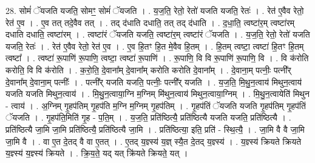 \documentclass[17pt]{extarticle}
\begin{document}
28. सोमं॑ ॅयजति यजति॒ सोमꣳ॒॒ सोमं॑ ॅयजति । . य॒ज॒ति॒ रेतो॒ रेतो॑ यजति यजति॒ रेतः॑ । . रेत॑ ए॒वैव रेतो॒ रेत॑ ए॒व । . ए॒व तत् तदे॒वैव तत् । . तद् द॑धाति दधाति॒ तत् तद् द॑धाति । . द॒धा॒ति॒ त्वष्टा॑र॒म् त्वष्टा॑रम् दधाति दधाति॒ त्वष्टा॑रम् । . त्वष्टा॑रं ॅयजति यजति॒ त्वष्टा॑र॒म् त्वष्टा॑रं ॅयजति । . य॒ज॒ति॒ रेतो॒ रेतो॑ यजति यजति॒ रेतः॑ । . रेत॑ ए॒वैव रेतो॒ रेत॑ ए॒व । . ए॒व हि॒तꣳ हि॒त मे॒वैव हि॒तम् । . हि॒तम् त्वष्टा॒ त्वष्टा॑ हि॒तꣳ हि॒तम् त्वष्टा᳚ । . त्वष्टा॑ रू॒पाणि॑ रू॒पाणि॒ त्वष्टा॒ त्वष्टा॑ रू॒पाणि॑ । . रू॒पाणि॒ वि वि रू॒पाणि॑ रू॒पाणि॒ वि । . वि क॑रोति करोति॒ वि वि क॑रोति । . क॒रो॒ति॒ दे॒वाना᳚म् दे॒वाना᳚म् करोति करोति दे॒वाना᳚म् । . दे॒वाना॒म् पत्नीः॒ पत्नी᳚र् दे॒वाना᳚म् दे॒वाना॒म् पत्नीः᳚ । . पत्नी᳚र् यजति यजति॒ पत्नीः॒ पत्नी᳚र् यजति । . य॒ज॒ति॒ मि॒थु॒न॒त्वाय॑ मिथुन॒त्वाय॑ यजति यजति मिथुन॒त्वाय॑ । . मि॒थु॒न॒त्वाया॒ग्नि म॒ग्निम् मि॑थुन॒त्वाय॑ मिथुन॒त्वाया॒ग्निम् । . मि॒थु॒न॒त्वायेति॑ मिथुन - त्वाय॑ । . अ॒ग्निम् गृ॒हप॑तिम् गृ॒हप॑ति म॒ग्नि म॒ग्निम् गृ॒हप॑तिम् । . गृ॒हप॑तिं ॅयजति यजति गृ॒हप॑तिम् गृ॒हप॑तिं ॅयजति । . गृ॒हप॑ति॒मिति॑ गृ॒ह - प॒ति॒म् । . य॒ज॒ति॒ प्रति॑ष्ठित्यै॒ प्रति॑ष्ठित्यै यजति यजति॒ प्रति॑ष्ठित्यै । . प्रति॑ष्ठित्यै जा॒मि जा॒मि प्रति॑ष्ठित्यै॒ प्रति॑ष्ठित्यै जा॒मि । . प्रति॑ष्ठित्या॒ इति॒ प्रति॑ - स्थि॒त्यै॒ । . जा॒मि वै वै जा॒मि जा॒मि वै । . वा ए॒त दे॒तद् वै वा ए॒तत् । . ए॒तद् य॒ज्ञ्स्य॑ य॒ज्ञ् स्यै॒त दे॒तद् य॒ज्ञ्स्य॑ । . य॒ज्ञ्स्य॑ क्रियते क्रियते य॒ज्ञ्स्य॑ य॒ज्ञ्स्य॑ क्रियते । . क्रि॒य॒ते॒ यद् यत् क्रि॑यते क्रियते॒ यत् । \newline
\end{document}
